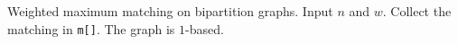 Weighted maximum matching on bipartition graphs. Input $n$ and $w$. Collect the matching in \texttt{m[]}. The graph is $1$-based.


